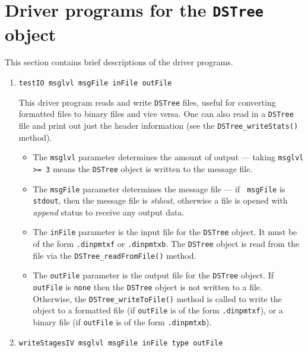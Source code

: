\par
\section{Driver programs for the {\tt DSTree} object}
\label{section:DSTree:drivers}
\par
This section contains brief descriptions of the driver programs.
\par
\begin{enumerate}
\item
\begin{verbatim}
testIO msglvl msgFile inFile outFile
\end{verbatim}
This driver program reads and write {\tt DSTree} files, useful for
converting formatted files to binary files and vice versa.
One can also read in a {\tt DSTree} file and print out just the 
header information (see the {\tt DSTree\_writeStats()} method).
\par
\begin{itemize}
\item
The {\tt msglvl} parameter determines the amount of output ---
taking {\tt msglvl >= 3} means the {\tt DSTree} object is written
to the message file.
\item
The {\tt msgFile} parameter determines the message file --- if {\tt
msgFile} is {\tt stdout}, then the message file is {\it stdout},
otherwise a file is opened with {\it append} status to receive any
output data.
\item
The {\tt inFile} parameter is the input file for the {\tt DSTree}
object. It must be of the form {\tt *.dinpmtxf} or {\tt *.dinpmtxb}.
The {\tt DSTree} object is read from the file via the
{\tt DSTree\_readFromFile()} method.
\item
The {\tt outFile} parameter is the output file for the {\tt DSTree}
object. 
If {\tt outFile} is {\tt none} then the {\tt DSTree} object is not
written to a file. 
Otherwise, the {\tt DSTree\_writeToFile()} method is called to write
the object to 
a formatted file (if {\tt outFile} is of the form {\tt *.dinpmtxf}),
or
a binary file (if {\tt outFile} is of the form {\tt *.dinpmtxb}).
\end{itemize}
\item
\begin{verbatim}
writeStagesIV msglvl msgFile inFile type outFile

\end{verbatim}
\end{enumerate}
